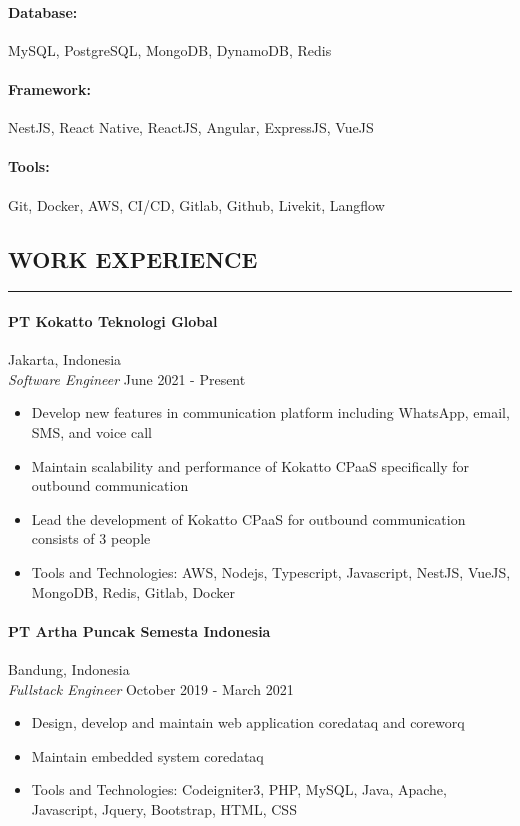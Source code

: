 \documentclass{article}
\begin{document}
\paragraph{Database:} MySQL, PostgreSQL, MongoDB, DynamoDB, Redis
\vspace{-1.4em}
\paragraph{Framework:} NestJS, React Native, ReactJS, Angular, ExpressJS, VueJS
\vspace{-1.4em}
\paragraph{Tools:} Git, Docker, AWS, CI/CD, Gitlab, Github, Livekit, Langflow

\subsection*{WORK EXPERIENCE}
\vspace{-0.1em}
\hrule
\vspace{0.4em}
\paragraph{PT Kokatto Teknologi Global} \hfill Jakarta, Indonesia \\
{\it Software Engineer} \hfill June 2021 - Present
\vspace{-0.5em}
\begin{itemize}
    \setlength{\itemsep}{-0.3em}
    \item Develop new features in communication platform including WhatsApp, email, SMS, and voice call
    \item Maintain scalability and performance of Kokatto CPaaS specifically for outbound communication
    \item Lead the development of Kokatto CPaaS for outbound communication consists of 3 people
    \item Tools and Technologies: AWS, Nodejs, Typescript, Javascript, NestJS, VueJS, MongoDB, Redis, Gitlab, Docker
\end{itemize}
\vspace{-2em}
\paragraph{PT Artha Puncak Semesta Indonesia} \hfill Bandung, Indonesia \\
{\it Fullstack Engineer} \hfill October 2019 - March 2021
\vspace{-0.5em}
\begin{itemize}
    \setlength{\itemsep}{-0.3em}
    \item Design, develop and maintain web application coredataq and coreworq
    \item Maintain embedded system coredataq
    \item Tools and Technologies: Codeigniter3, PHP, MySQL, Java, Apache, Javascript, Jquery, Bootstrap, HTML, CSS
\end{itemize}
\end{document}
